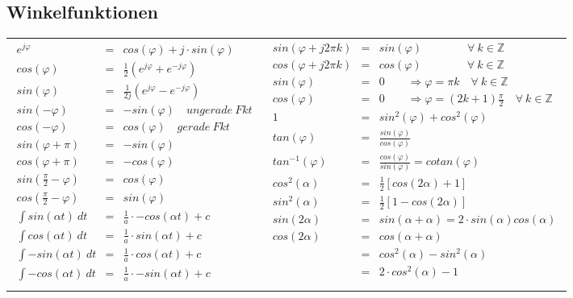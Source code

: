 \subsection{Winkelfunktionen}
\begin{tabular}{ll}
 \addtolength{\jot}{2mm}
 \parbox{6cm}{\begin{eqnarray*}
 e^{j \varphi} &=& cos( \varphi )+ j \cdot sin( \varphi )\\
 cos( \varphi) &=& \frac{1}{2} (e^{j \varphi} + e^{-j \varphi})\\
 sin( \varphi) &=& \frac{1}{2j} (e^{j \varphi} - e^{-j \varphi})\\
 sin( - \varphi) &=& - sin(\varphi)\quad ungerade~Fkt \\
 cos( - \varphi) &=& cos(\varphi)  \quad gerade~Fkt\\
 sin(\varphi + \pi ) &=& - sin(\varphi)  \\
 cos(\varphi + \pi ) &=& - cos(\varphi)\\
 sin(\frac{\pi}{2} - \varphi) &=& cos(\varphi) \\
 cos(\frac{\pi}{2} - \varphi) &=& sin(\varphi) \\
 \int sin (\alpha t) ~dt &=& \frac{1}{a} \cdot -cos(\alpha t) + c\\
\int cos (\alpha t) ~dt &=& \frac{1}{a} \cdot sin(\alpha t) + c\\
\int -sin (\alpha t) ~dt &=& \frac{1}{a} \cdot cos(\alpha t) + c\\
\int -cos (\alpha t) ~dt &=& \frac{1}{a} \cdot -sin(\alpha t) + c\\
 \end{eqnarray*}}
 &
 \addtolength{\jot}{2mm}
 \parbox{5cm}{\begin{eqnarray*}
  sin( \varphi + j2 \pi k) &=& sin( \varphi ) \qquad \qquad \forall ~ k  \in \mathbb{Z}\\
  cos( \varphi + j2 \pi k) &=& cos( \varphi ) \qquad \qquad \forall ~ k \in \mathbb{Z}\\
 sin( \varphi) &=& 0 \qquad \Rightarrow \varphi = \pi k  \quad \forall ~ k  \in \mathbb{Z}\\
  cos( \varphi) &=& 0 \qquad \Rightarrow \varphi = (2k+1)\frac{\pi}{2}  \quad \forall ~ k  \in \mathbb{Z}\\
  1 &=& sin^2(\varphi) + cos^2(\varphi)\\
  tan( \varphi) &=& \frac{sin(\varphi)}{cos(\varphi)}\\
  tan^{-1}( \varphi)  &=& \frac{cos(\varphi)}{sin(\varphi)} = cotan( \varphi)\\ 
  cos^2(\alpha) &=& \frac{1}{2} [cos(2 \alpha)+1]\\
sin^2(\alpha) &=& \frac{1}{2} [1 - cos (2 \alpha)]\\ 
sin(2 \alpha) &=& sin( \alpha + \alpha) = 2\cdot sin( \alpha) cos( \alpha)\\
cos(2 \alpha) &=& cos( \alpha + \alpha) \\
&=& cos^2(\alpha)-sin^2(\alpha) \\
&=& 2 \cdot cos^2(\alpha)-1\\
  \end{eqnarray*}}
\end{tabular}\\
